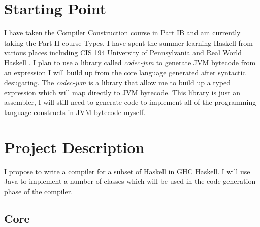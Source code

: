 \documentclass[a4paper]{article}
\begin{document}
\section*{Starting Point}
  I have taken the Compiler Construction course in Part IB and am currently taking the Part II course Types. I have spent the summer
  learning Haskell from various places including CIS 194 University of Pennsylvania \cite{cis194} and Real World Haskell \cite{realwordhaskell}.
  I plan to use a library called \textit{codec-jvm} to generate JVM bytecode from an expression I will build up from the core language generated after
  syntactic desugaring. The \textit{codec-jvm} is a library that allow me to build up a typed expression which will map directly
  to JVM bytecode. This library is just an assembler, I will still need to generate code to implement all of the 
  programming language constructs in JVM bytecode myself.


\section*{Project Description}
  I propose to write a compiler for a subset of Haskell in GHC Haskell. I will use Java to implement a number of classes which will be used in the
  code generation phase of the compiler.

  \subsection*{Core}
\end{document}
